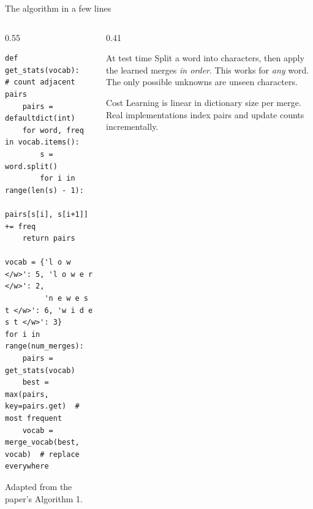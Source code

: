 \documentclass[aspectratio=169,11pt]{beamer}
\begin{document}
\begin{frame}[fragile]{The algorithm in a few lines}
  \begin{columns}[T]
    \begin{column}{0.55\textwidth}
      \scriptsize
\begin{verbatim}
def get_stats(vocab):             # count adjacent pairs
    pairs = defaultdict(int)
    for word, freq in vocab.items():
        s = word.split()
        for i in range(len(s) - 1):
            pairs[s[i], s[i+1]] += freq
    return pairs

vocab = {'l o w </w>': 5, 'l o w e r </w>': 2,
         'n e w e s t </w>': 6, 'w i d e s t </w>': 3}
for i in range(num_merges):
    pairs = get_stats(vocab)
    best = max(pairs, key=pairs.get)  # most frequent
    vocab = merge_vocab(best, vocab)  # replace everywhere
\end{verbatim}
      {\scriptsize Adapted from the paper's Algorithm 1.}
    \end{column}
    \begin{column}{0.41\textwidth}
      \begin{block}{At test time}
        \small
        Split a word into characters, then apply the learned merges \emph{in order}.
        This works for \emph{any} word. The only possible unknowns are unseen characters.
      \end{block}
      \begin{block}{Cost}
        \small
        Learning is linear in dictionary size per merge. Real implementations index pairs and update counts incrementally.
      \end{block}
    \end{column}
  \end{columns}
\end{frame}
\end{document}
